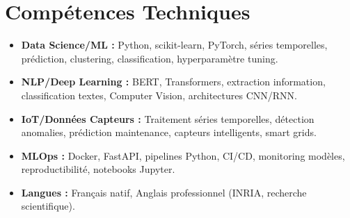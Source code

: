 \documentclass[a4paper,11pt]{article}
\begin{document}
\section{Comp\'etences Techniques}
\begin{itemize}[leftmargin=*, label=\tiny$\bullet$, nosep]
    \item \textbf{Data Science/ML :} Python, scikit-learn, PyTorch, s\'eries temporelles, pr\'ediction, clustering, classification, hyperparam\`etre tuning.
    \item \textbf{NLP/Deep Learning :} BERT, Transformers, extraction information, classification textes, Computer Vision, architectures CNN/RNN.
    \item \textbf{IoT/Donn\'ees Capteurs :} Traitement s\'eries temporelles, d\'etection anomalies, pr\'ediction maintenance, capteurs intelligents, smart grids.
    \item \textbf{MLOps :} Docker, FastAPI, pipelines Python, CI/CD, monitoring mod\`eles, reproductibilit\'e, notebooks Jupyter.
    \item \textbf{Langues :} Fran\c{c}ais natif, Anglais professionnel (INRIA, recherche scientifique).
\end{itemize}
\end{document}
